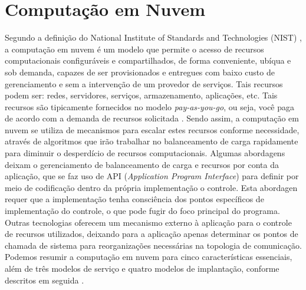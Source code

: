 \documentclass[twoside,english,brazilian]{UNISINOSmonografia}
\begin{document}
\section{Computação em Nuvem}
\label{cloud}
Segundo a definição do National Institute of Standards and Technologies (NIST) \cite{Mell2012}, a computação em nuvem é um modelo que permite o acesso de recursos computacionais configuráveis e compartilhados, de forma conveniente, ubíqua e sob demanda, capazes de ser provisionados e entregues com baixo custo de gerenciamento e sem a intervenção de um provedor de serviços. Tais recursos podem ser: redes, servidores, serviços, armazenamento, aplicações, etc. Tais recursos são tipicamente fornecidos no modelo \textit{pay-as-you-go}, ou seja, você paga de acordo com a demanda de recursos solicitada \cite{Suleiman2012}. Sendo assim, a computação em nuvem se utiliza de mecanismos para escalar estes recursos conforme necessidade, através de algoritmos que irão trabalhar no balanceamento de carga rapidamente para diminuir o desperdício de recursos computacionais.
Algumas abordagens deixam o gerenciamento de balanceamento de carga e recursos por conta da aplicação, que se faz uso de API (\textit{Application Program Interface}) para definir por meio de codificação dentro da própria implementação o controle. Esta abordagen requer que a implementação tenha consciência dos pontos específicos de implementação do controle, o que pode fugir do foco principal do programa. Outras tecnologias oferecem um mecanismo externo à aplicação para o controle de recursos utilizados, deixando para a aplicação apenas determinar os pontos de chamada de sistema para reorganizações necessárias na topologia de comunicação. 
Podemos resumir a computação em nuvem para cinco características essenciais, além de três modelos de serviço e quatro modelos de implantação, conforme descritos em seguida \cite{Verdi2010}.
\end{document}

